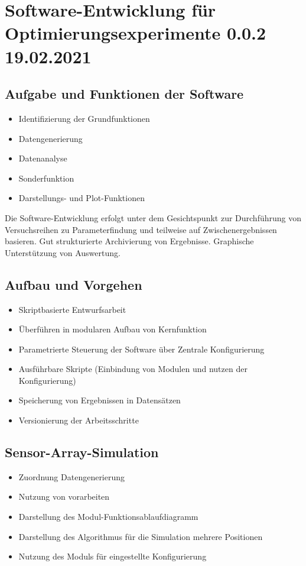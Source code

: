 %

\chapter{Software-Entwicklung für Optimierungsexperimente 0.0.2 19.02.2021}\label{ch:sw-entwicklung-f-opt-exp}

\section{Aufgabe und Funktionen der Software}\label{sec:aufgabe-und-funktionen-sw}
\begin{itemize}
	\item Identifizierung der Grundfunktionen
	\item Datengenerierung
	\item Datenanalyse
	\item Sonderfunktion
	\item Darstellungs- und Plot-Funktionen
\end{itemize}

Die Software-Entwicklung erfolgt unter dem Gesichtspunkt zur Durchführung von Versuchsreihen zu 
Parameterfindung und teilweise auf Zwischenergebnissen basieren.
Gut strukturierte Archivierung von Ergebnisse.
Graphische Unterstützung von Auswertung.
 
\section{Aufbau und Vorgehen}\label{sec:aufbau-und-vorgehen}
	\begin{itemize}
		\item Skriptbasierte Entwurfsarbeit
		\item Überführen in modularen Aufbau von Kernfunktion
		\item Parametrierte Steuerung der Software über Zentrale Konfigurierung
		\item Ausführbare Skripte (Einbindung von Modulen und nutzen der Konfigurierung)
		\item Speicherung von Ergebnissen in Datensätzen
		\item Versionierung der Arbeitsschritte
	\end{itemize}


\section{Sensor-Array-Simulation}\label{sec:sensor-array-simulation}
	\begin{itemize}
		\item Zuordnung Datengenerierung
		\item Nutzung von vorarbeiten
		\item Darstellung des Modul-Funktionsablaufdiagramm
		\item Darstellung des Algorithmus für die Simulation mehrere Positionen
		\item Nutzung des Moduls für eingestellte Konfigurierung
	\end{itemize}

